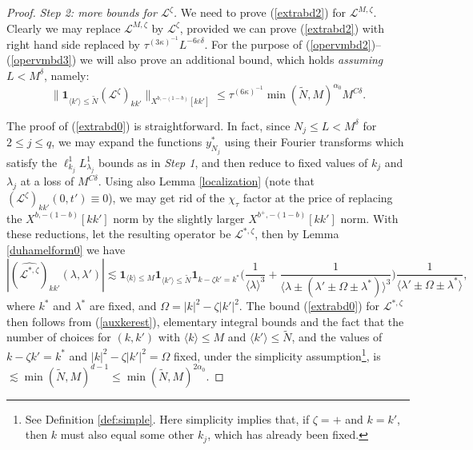 \documentclass[11 pt,reqno]{amsart}
\theoremstyle{definition}
\theoremstyle{remark}
\numberwithin{equation}{section}
\newcommand{\Ls}{\mathscr{L}}
\begin{document}
{\begin{proof}
\emph{Step 2: more bounds for $\Ls^\zeta$.} We need to prove (\ref{extrabd2}) for $\Ls^{M,\zeta}$. Clearly we may replace $\Ls^{M,\zeta}$ by $\Ls^{\zeta}$, provided we can prove (\ref{extrabd2}) with right hand side replaced by $\tau^{(3\kappa)^{-1}}L^{-6\varepsilon\delta}$. For the purpose of (\ref{opervmbd2})--(\ref{opervmbd3}) we will also prove an additional bound, which holds \emph{assuming} $L<M^\delta$, namely: \begin{equation}\label{extrabd0}\|\mathbf{1}_{\langle k'\rangle\leq \widetilde{N}}(\Ls^\zeta)_{kk'}\|_{X^{b,-(1-b)}[kk']}\leq \tau^{(6\kappa)^{-1}}\min(\widetilde{N},M)^{\alpha_0}M^{C\delta}.
\end{equation}

The proof of (\ref{extrabd0}) is straightforward. In fact, since $N_j\leq L<M^\delta$ for $2\leq j\leq q$, we may expand the functions $y_{N_j}^*$ using their Fourier transforms which satisfy the $\ell_{k_j}^1L_{\lambda_j}^1$ bounds as in \emph{Step 1}, and then reduce to fixed values of $k_j$ and $\lambda_j$ at a loss of $M^{C\delta}$. Using also Lemma \ref{localization} (note that $(\Ls^\zeta)_{kk'}(0,t')\equiv 0$), we may get rid of the $\chi_\tau$ factor at the price of replacing the $X^{b,-(1-b)}[kk']$ norm by the slightly larger $X^{b^+,-(1-b)}[kk']$ norm. With these reductions, let the resulting operator be $\Ls^{*,\zeta}$, then by Lemma \ref{duhamelform0} we have
\begin{equation}\label{auxkerest}|(\widehat{\Ls^{*,\zeta}})_{kk'}(\lambda,\lambda')|\lesssim\mathbf{1}_{\langle k\rangle\leq M}\mathbf{1}_{\langle k'\rangle\leq  \widetilde{N}}\mathbf{1}_{k-\zeta k'=k^*}\bigg(\frac{1}{\langle\lambda\rangle^3}+\frac{1}{\langle\lambda\pm(\lambda'\pm\Omega\pm\lambda^*)\rangle^3}\bigg)\frac{1}{\langle\lambda'\pm\Omega\pm\lambda^*\rangle},\end{equation} where $k^*$ and $\lambda^*$ are fixed, and $\Omega=|k|^2-\zeta|k'|^2$. The bound (\ref{extrabd0}) for $\Ls^{*,\zeta}$ then follows from (\ref{auxkerest}), elementary integral bounds and the fact that the number of choices for $(k,k')$ with $\langle k\rangle\leq M$ and $\langle k'\rangle\leq \widetilde{N}$, and the values of $k-\zeta k'=k^*$ and $|k|^2-\zeta |k'|^2=\Omega$ fixed, under the simplicity assumption\footnote{See Definition \ref{def:simple}. Here simplicity implies that, if $\zeta=+$ and $k=k'$, then $k$ must also equal some other $k_j$, which has already been fixed.}, is $\lesssim\min(\widetilde{N},M)^{d-1} \leq \min(\widetilde{N},M)^{2\alpha_0}$.


\end{proof}}
\end{document}
